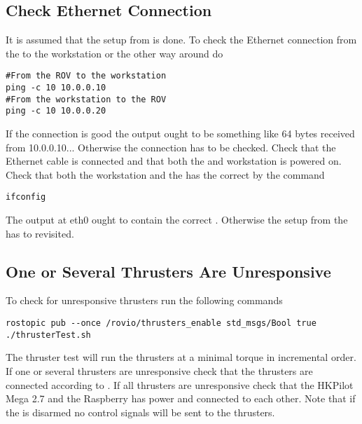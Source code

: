 \subsection{Check Ethernet Connection}
It is assumed that the setup from  is done. To check the Ethernet connection from the \abbrROV to the workstation or the other way around do
\begin{lstlisting}
#From the ROV to the workstation
ping -c 10 10.0.0.10 
#From the workstation to the ROV
ping -c 10 10.0.0.20
\end{lstlisting}
If the connection is good the output ought to be something like 64 bytes received from 10.0.0.10... Otherwise the connection has to be checked. Check that the Ethernet cable is connected and that both the \abbrROV and workstation is powered on. Check that both the workstation and the \abbrROV has the correct \abbrIP by the command
\begin{lstlisting}
ifconfig
\end{lstlisting}
The output at eth0 ought to contain the correct \abbrIP. Otherwise the setup from the  has to revisited.

\subsection{One or Several Thrusters Are Unresponsive}\label{subsec:unresponsive}
To check for unresponsive thrusters run the following commands 
\begin{lstlisting}
rostopic pub --once /rovio/thrusters_enable std_msgs/Bool true
./thrusterTest.sh
\end{lstlisting}
The thruster test will run the thrusters at a minimal torque in incremental order. If one or several thrusters are unresponsive check that the thrusters are connected according to . If all thrusters are unresponsive check that the HKPilot Mega 2.7 and the Raspberry has power and connected to each other. Note that if the \abbrROV is disarmed no control signals will be sent to the thrusters.

